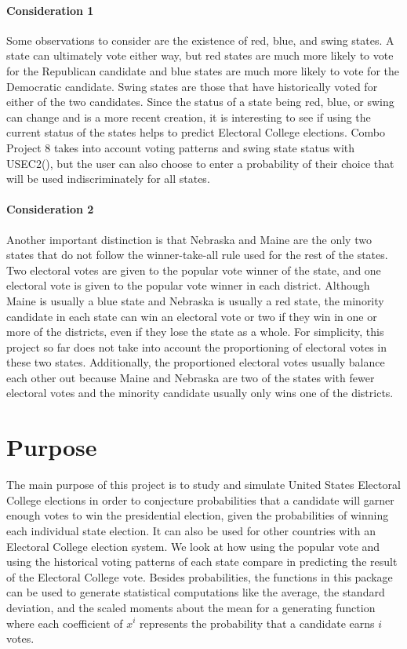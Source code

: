 \documentclass[12pt]{article}
\begin{document}
\paragraph{Consideration 1} Some observations to consider are the existence of red, blue, and swing states. A state can ultimately vote either way, but red states are much more likely to vote for the Republican candidate and blue states are much more likely to vote for the Democratic candidate. Swing states are those that have historically voted for either of the two candidates. Since the status of a state being red, blue, or swing can change and is a more recent creation, it is interesting to see if using the current status of the states helps to predict Electoral College elections. Combo Project 8 takes into account voting patterns and swing state status with USEC2(), but the user can also choose to enter a probability of their choice that will be used indiscriminately for all states.

\paragraph{Consideration 2}  Another important distinction is that Nebraska and Maine are the only two states that do not follow the winner-take-all rule used for the rest of the states. Two electoral votes are given to the popular vote winner of the state, and one electoral vote is given to the popular vote winner in each district. Although Maine is usually a blue state and Nebraska is usually a red state, the minority candidate in each state can win an electoral vote or two if they win in one or more of the districts, even if they lose the state as a whole. For simplicity, this project so far does not take into account the proportioning of electoral votes in these two states. Additionally, the proportioned electoral votes usually balance each other out because Maine and Nebraska are two of the states with fewer electoral votes and the minority candidate usually only wins one of the districts.

\section{Purpose}

The main purpose of this project is to study and simulate United States Electoral College elections in order to conjecture probabilities that a candidate will garner enough votes to win the presidential election, given the probabilities of winning each individual state election. It can also be used for other countries with an Electoral College election system. We look at how using the popular vote and using the historical voting patterns of each state compare in predicting the result of the Electoral College vote. Besides probabilities, the functions in this package can be used to generate statistical computations like the average, the standard deviation, and the scaled moments about the mean for a generating function where each coefficient of $x^i$ represents the probability that a candidate earns $i$ votes.
\end{document}
